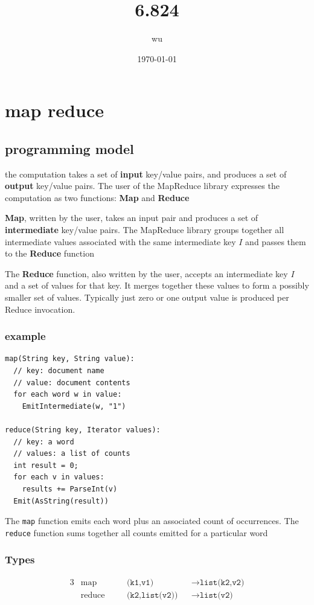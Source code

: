 \documentclass[11pt]{article}
\author{wu}
\date{\today}
\title{6.824}
\begin{document}
\maketitle
\tableofcontents


\section{map reduce}
\label{sec:orgd6a4550}

\subsection{programming model}
\label{sec:orgab3d4a3}
the computation takes a set of \textbf{input} key/value pairs, and produces a set of \textbf{output} key/value
pairs. The user of the MapReduce library expresses the computation as two functions: \textbf{Map} and
\textbf{Reduce}

\textbf{Map}, written by the user, takes an input pair and produces a set of \textbf{intermediate} key/value
pairs. The MapReduce library groups together all intermediate values associated with the same
intermediate key \(I\) and passes them to the \textbf{Reduce} function

The \textbf{Reduce} function, also written by the user, accepts an intermediate key \(I\)  and a set of
values for that key. It merges together these values to form a possibly smaller set of values.
Typically just zero or one output value is produced per Reduce invocation.

\subsubsection{example}
\label{sec:org8c4b11d}
\begin{verbatim}
map(String key, String value):
  // key: document name
  // value: document contents
  for each word w in value:
    EmitIntermediate(w, "1")

reduce(String key, Iterator values):
  // key: a word
  // values: a list of counts
  int result = 0;
  for each v in values:
    results += ParseInt(v)
  Emit(AsString(result))
\end{verbatim}
The \texttt{map} function emits each word plus an associated count of occurrences. The \texttt{reduce} function
sums together all counts emitted for a particular word

\subsubsection{Types}
\label{sec:orge88bcd9}
\begin{alignat*}{3}
&\text{map}&&\texttt{(k1,v1)}&&\to\texttt{list(k2,v2)}\\
&\text{reduce}\quad&&\texttt{(k2,list(v2))}&&\to\texttt{list(v2)}\\
\end{alignat*}
\end{document}
